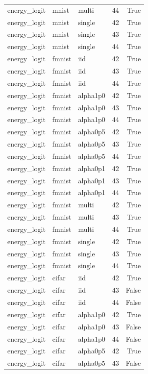 \begin{tabular}{lllrr}
energy\_logit & mnist & multi & 44 & True \\
energy\_logit & mnist & single & 42 & True \\
energy\_logit & mnist & single & 43 & True \\
energy\_logit & mnist & single & 44 & True \\
energy\_logit & fmnist & iid & 42 & True \\
energy\_logit & fmnist & iid & 43 & True \\
energy\_logit & fmnist & iid & 44 & True \\
energy\_logit & fmnist & alpha1p0 & 42 & True \\
energy\_logit & fmnist & alpha1p0 & 43 & True \\
energy\_logit & fmnist & alpha1p0 & 44 & True \\
energy\_logit & fmnist & alpha0p5 & 42 & True \\
energy\_logit & fmnist & alpha0p5 & 43 & True \\
energy\_logit & fmnist & alpha0p5 & 44 & True \\
energy\_logit & fmnist & alpha0p1 & 42 & True \\
energy\_logit & fmnist & alpha0p1 & 43 & True \\
energy\_logit & fmnist & alpha0p1 & 44 & True \\
energy\_logit & fmnist & multi & 42 & True \\
energy\_logit & fmnist & multi & 43 & True \\
energy\_logit & fmnist & multi & 44 & True \\
energy\_logit & fmnist & single & 42 & True \\
energy\_logit & fmnist & single & 43 & True \\
energy\_logit & fmnist & single & 44 & True \\
energy\_logit & cifar & iid & 42 & True \\
energy\_logit & cifar & iid & 43 & False \\
energy\_logit & cifar & iid & 44 & False \\
energy\_logit & cifar & alpha1p0 & 42 & True \\
energy\_logit & cifar & alpha1p0 & 43 & False \\
energy\_logit & cifar & alpha1p0 & 44 & False \\
energy\_logit & cifar & alpha0p5 & 42 & True \\
energy\_logit & cifar & alpha0p5 & 43 & False \\

\end{tabular}
